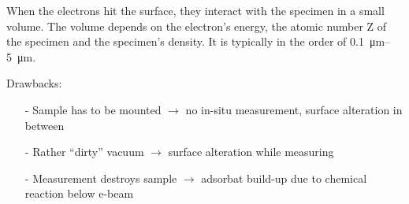 When the electrons hit the surface, they interact with the specimen in a small volume. The volume depends on the electron's energy, the atomic number Z of the specimen and the specimen's density. It is typically in the order of \SIrange{0.1}{5}{\micro \meter}.

Drawbacks:
\begin{itemize}
 \item[-] Sample has to be mounted $\rightarrow$ no in-situ measurement, surface alteration in between
 \item[-] Rather ``dirty'' vacuum $\rightarrow$ surface alteration while measuring
 \item[-] Measurement destroys sample $\rightarrow$ adsorbat build-up due to chemical reaction below e-beam
\end{itemize}

